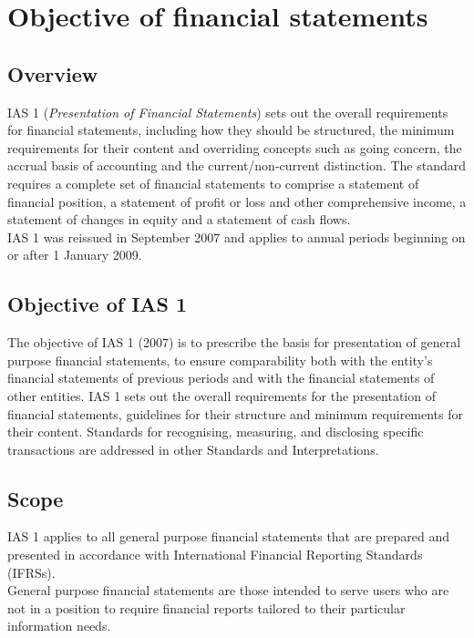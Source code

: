 \section{Objective of financial statements}
\label{Objective}

\subsection{Overview}
IAS 1 (\textit{Presentation of Financial Statements}) sets out the overall requirements for financial statements, including how they should be structured, the minimum requirements for their content and overriding concepts such as going concern, the accrual basis of accounting and the current/non-current distinction. The standard requires a complete set of financial statements to comprise a statement of financial position, a statement of profit or loss and other comprehensive income, a statement of changes in equity and a statement of cash flows. \\

IAS 1 was reissued in September 2007 and applies to annual periods beginning on or after 1 January 2009.

\subsection{Objective of IAS 1}
The objective of IAS 1 (2007) is to prescribe the basis for presentation of general purpose financial statements, to ensure comparability both with the entity's financial statements of previous periods and with the financial statements of other entities. IAS 1 sets out the overall requirements for the presentation of financial statements, guidelines for their structure and minimum requirements for their content. Standards for recognising, measuring, and disclosing specific transactions are addressed in other Standards and Interpretations.

\subsection{Scope}
IAS 1 applies to all general purpose financial statements that are prepared and presented in accordance with International Financial Reporting Standards (IFRSs). \\

General purpose financial statements are those intended to serve users who are not in a position to require financial reports tailored to their particular information needs.

